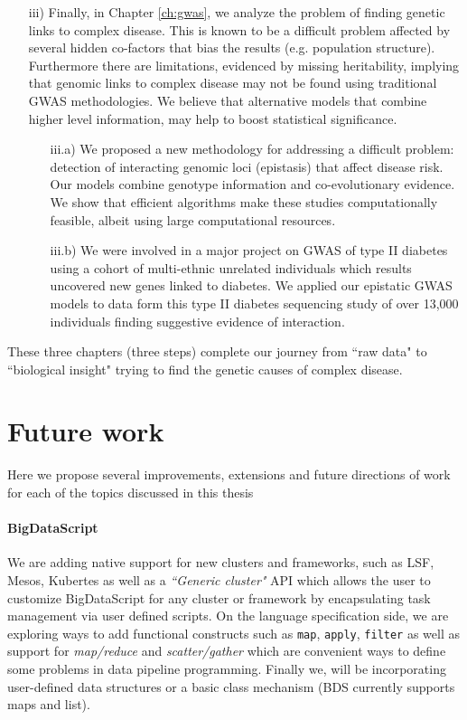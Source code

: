 \begin{itemize}
\item[iii)] Finally, in Chapter \ref{ch:gwas}, we analyze the problem of finding genetic links to complex disease. This is known to be a difficult problem affected by several hidden co-factors that bias the results (e.g. population structure). Furthermore there are limitations, evidenced by missing heritability, implying that genomic links to complex disease may not be found using traditional GWAS methodologies. We believe that alternative models that combine higher level information, may help to boost statistical significance. 

	\begin{itemize}
		\item[iii.a)] We proposed a new methodology for addressing a difficult problem: detection of interacting genomic loci (epistasis) that affect disease risk. Our models combine genotype information and co-evolutionary evidence. We show that efficient algorithms make these studies computationally feasible, albeit using large computational resources.
	
		\item[iii.b)] We were involved in a major project on GWAS of type II diabetes using a cohort of multi-ethnic unrelated individuals which results uncovered new genes linked to diabetes. We applied our epistatic GWAS models to data form this type II diabetes sequencing study of over 13,000 individuals finding suggestive evidence of interaction.
			\end{itemize}
	
\end{itemize}

These three chapters (three steps) complete our journey from ``raw data" to ``biological insight" trying to find the genetic causes of complex disease.

\section{Future work}

Here we propose several improvements, extensions and future directions of work for each of the topics discussed in this thesis \\

\paragraph{BigDataScript}
We are adding native support for new clusters and frameworks, such as LSF, Mesos, Kubertes as well as a \textit{``Generic cluster"} API which allows the user to customize BigDataScript for any cluster or framework by encapsulating task management via user defined scripts. On the language specification side, we are exploring ways to add functional constructs such as \texttt{map}, \texttt{apply}, \texttt{filter} as well as support for \textit{map/reduce} and \textit{scatter/gather} which are convenient ways to define some problems in data pipeline programming. Finally we, will be incorporating user-defined data structures or a basic class mechanism (BDS currently supports maps and list).

